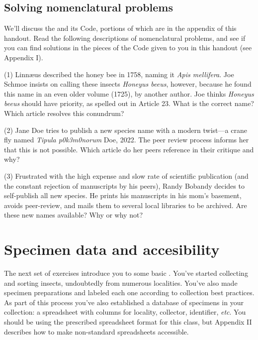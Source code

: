 \subsection{Solving nomenclatural problems}
We'll discuss the \cite{iczn} and its Code, portions of which are in the appendix of this handout. Read the following descriptions of nomenclatural problems, and see if you can find solutions in the pieces of the Code given to you in this handout (see Appendix I).\vspace{3mm}

\begin{theo}[systematics6] 
{}(1) Linn\ae{}us described the honey bee in 1758, naming it \textit{Apis mellifera}. Joe Schmoe insists on calling these insects \textit{Honeyus beeus}, however, because he found this name in an even older volume (1725), by another author. Joe thinks \textit{Honeyus beeus} should have priority, as spelled out in Article 23. What is the correct name? Which article resolves this conundrum?\vspace{3mm}

\noindent{}(2) Jane Doe tries to publish a new species name with a modern twist---a crane fly named \textit{Tipula p0k3m0norum} Doe, 2022. The peer review process informs her that this is not possible. Which article do her peers reference in their critique and why?\vspace{3mm}

\noindent{}(3) Frustrated with the high expense and slow rate of scientific publication (and the constant rejection of manuscripts by his peers), Randy Bobandy decides to self-publish all new species. He prints his manuscripts in his mom's basement, avoids peer-review, and mails them to several local libraries to be archived. Are these new names available? Why or why not?
\end{theo}

\section{Specimen data and accesibility}
The next set of exercises introduce you to some basic . You've started collecting and sorting insects, undoubtedly from numerous localities. You've also made specimen preparations and labeled each one according to collection best practices. As part of this process you've also established a database of specimens in your collection: a spreadsheet with columns for locality, collector, identifier, \textit{etc}. You should be using the prescribed spreadsheet format for this class, but Appendix II describes how to make non-standard spreadsheets accessible.\vspace{3mm}

